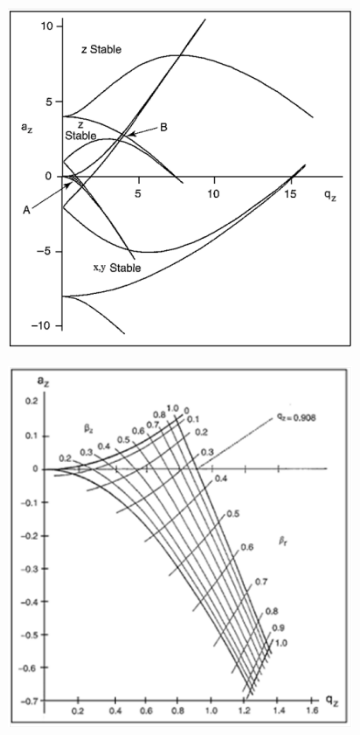 \documentclass[numbers=noenddot,a4paper,notitlepage,twoside,BCOR15mm]{scrartcl}
\begin{document}
			\begin{figure}[t]
				\centering
				\begin{subfigure}[t]{0.4\textwidth}
					\includegraphics[width=\textwidth]{stab_1.png}
					\caption{}\label{img:stab1}
				\end{subfigure}
				\vspace{0.2cm}
				\begin{subfigure}[t]{0.37\textwidth}
					\includegraphics[width=\textwidth]{stab_2.png}

\end{subfigure}
\end{figure}
\end{document}
